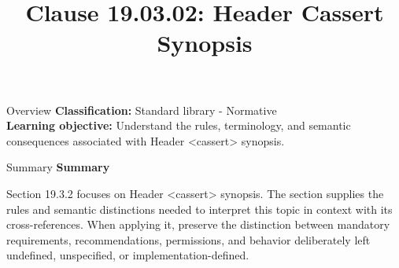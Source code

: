 \documentclass[10pt,letterpaper]{article}
\title{Clause 19.03.02: Header Cassert Synopsis}
\author{}
\date{}
\begin{document}
\maketitle
\begin{CornellOverviewBox}{Overview}
\textbf{Classification:} Standard library - Normative\\[2pt]
\textbf{Learning objective:} Understand the rules, terminology, and semantic consequences associated with Header <cassert> synopsis.
\end{CornellOverviewBox}\begin{CornellSummaryBox}{Summary}
{\sffamily\bfseries\color{Accent} Summary}\par\vspace{3pt}Section 19.3.2 focuses on Header <cassert> synopsis. The section supplies the rules and semantic distinctions needed to interpret this topic in context with its cross-references. When applying it, preserve the distinction between mandatory requirements, recommendations, permissions, and behavior deliberately left undefined, unspecified, or implementation-defined.
\end{CornellSummaryBox}
\end{document}
